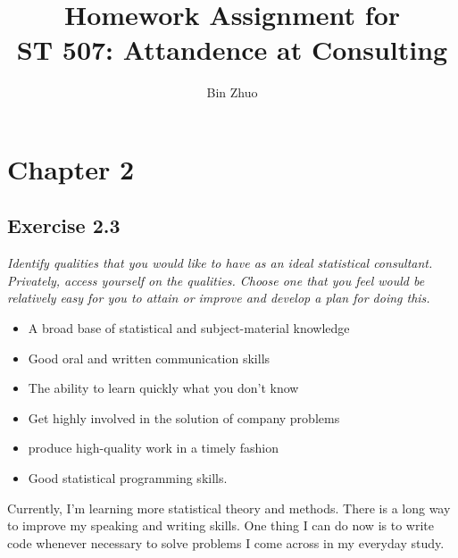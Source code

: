 \documentclass[a4paper,11pt]{article}
\date{}
\author{Bin Zhuo}
\title{\textbf{Homework Assignment  for\\ ST 507: Attandence at Consulting}}
\begin{document}
\maketitle
\vskip 1cm
\newcommand{\tabincell}[2]{\begin{tabular}{@{}#1@{}}#2\end{tabular}}

\section*{Chapter 2}

\subsection*{Exercise 2.3}
\emph{\indent Identify qualities that you would like to have as an ideal statistical consultant. Privately, access yourself on the qualities. Choose one that you feel would be relatively easy for you to attain or improve and develop a plan for doing this.}
\\
\begin{itemize}
  \item A broad base of statistical and subject-material knowledge
  \item Good oral and written communication skills
  \item The ability to learn quickly what you don't know
  \item Get highly involved in the solution of company problems
  \item produce high-quality work in a timely fashion
  \item Good statistical programming skills.
\end{itemize}
Currently, I'm learning more statistical theory and methods. There is a long way to improve my speaking and writing skills. One thing I can do now is to write code whenever necessary to solve problems I come across in my everyday study.
\end{document}
